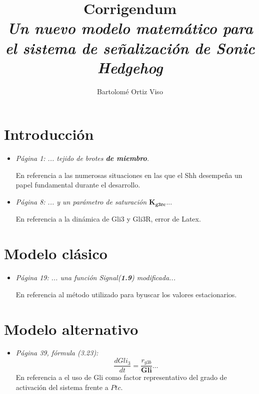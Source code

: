 \documentclass[a4paper,11pt]{article}
\title{\textbf{Corrigendum} \\ \large{\textit{ Un nuevo modelo matemático para el sistema de señalización de Sonic Hedgehog}}}
\author{Bartolomé Ortiz Viso }
\begin{document}
\maketitle

\section{Introducción}
\begin{itemize}
	\item \textit{Página 1:} \textit{... tejido de brotes \textbf{de miembro}.} 
	
	En referencia a las numerosas situaciones en las que el Shh desempeña un papel fundamental durante el desarrollo.
	\item \textit{Página 8:} \textit{... y un parámetro de saturación $\textbf{K}_{\textbf{g3rc}}$}...
	
	En referencia a la dinámica de Gli3 y Gli3R, error de Latex. 
\end{itemize}
\section{Modelo clásico}
\begin{itemize}
	\item \textit{Página 19:} \textit{... una función \textit{Signal}(\textbf{1.9}) modificada...} 
	
	En referencia al método utilizado para byuscar los valores estacionarios.
\end{itemize}
\section{Modelo alternativo}
	\begin{itemize}
	\item \textit{Página 39, fórmula (3.23):} $$\frac{dGli_3}{dt}=\frac{r_{g3b}}{\textbf{Gli}}\dots$$ En referencia a el uso de Gli como factor representativo del grado de activación del sistema frente a $Ptc$.
	\end{itemize}
\end{document}
